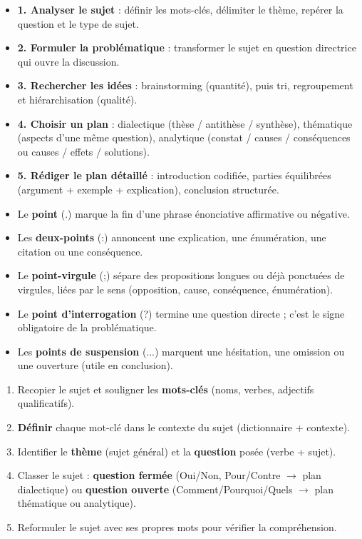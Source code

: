 \documentclass[11pt]{article}
\begin{document}
\begin{aretenir}
\begin{itemize}
\item \textbf{1. Analyser le sujet} : définir les mots-clés, délimiter le thème, repérer la question et le type de sujet.
\item \textbf{2. Formuler la problématique} : transformer le sujet en question directrice qui ouvre la discussion.
\item \textbf{3. Rechercher les idées} : brainstorming (quantité), puis tri, regroupement et hiérarchisation (qualité).
\item \textbf{4. Choisir un plan} : dialectique (thèse / antithèse / synthèse), thématique (aspects d'une même question), analytique (constat / causes / conséquences ou causes / effets / solutions).
\item \textbf{5. Rédiger le plan détaillé} : introduction codifiée, parties équilibrées (argument + exemple + explication), conclusion structurée.
\end{itemize}
\end{aretenir}

\begin{aretenir}
\begin{itemize}
\item Le \textbf{point} (.) marque la fin d'une phrase énonciative affirmative ou négative.
\item Les \textbf{deux-points} (:) annoncent une explication, une énumération, une citation ou une conséquence.
\item Le \textbf{point-virgule} (;) sépare des propositions longues ou déjà ponctuées de virgules, liées par le sens (opposition, cause, conséquence, énumération).
\item Le \textbf{point d'interrogation} (?) termine une question directe ; c'est le signe obligatoire de la problématique.
\item Les \textbf{points de suspension} (...) marquent une hésitation, une omission ou une ouverture (utile en conclusion).
\end{itemize}
\end{aretenir}

\begin{methode}
\begin{enumerate}
\item Recopier le sujet et souligner les \textbf{mots-clés} (noms, verbes, adjectifs qualificatifs).
\item \textbf{Définir} chaque mot-clé dans le contexte du sujet (dictionnaire + contexte).
\item Identifier le \textbf{thème} (sujet général) et la \textbf{question} posée (verbe + sujet).
\item Classer le sujet : \textbf{question fermée} (Oui/Non, Pour/Contre $\rightarrow$ plan dialectique) ou \textbf{question ouverte} (Comment/Pourquoi/Quels $\rightarrow$ plan thématique ou analytique).
\item Reformuler le sujet avec ses propres mots pour vérifier la compréhension.
\end{enumerate}
\end{methode}
\end{document}
